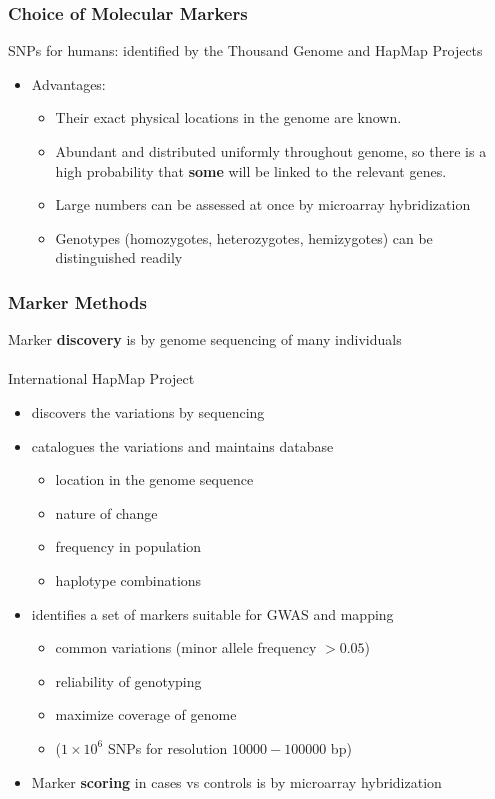 \documentclass[10pt]{article}
\begin{document}
\subsubsection*{Choice of Molecular Markers}
SNPs for humans: identified by the Thousand Genome and HapMap Projects
\begin{itemize}
	\item Advantages:
	\begin{itemize}
	    \item Their exact physical locations in the genome are known.
	    \item Abundant and distributed uniformly throughout genome, so there is a high probability that \textbf{some} will be linked to the relevant genes.
	    \item Large numbers can be assessed at once by microarray hybridization
	    \item Genotypes (homozygotes, heterozygotes, hemizygotes) can be distinguished readily
    \end{itemize}
\end{itemize}

\subsubsection*{Marker Methods}
Marker \textbf{discovery} is by genome sequencing of many individuals\\\\
International HapMap Project
\begin{itemize}
	\item discovers the variations by sequencing
	\item catalogues the variations and maintains database
	\begin{itemize}
	    \item location in the genome sequence
	    \item nature of change
	    \item frequency in population
	    \item haplotype combinations
    \end{itemize}
	\item identifies a set of markers suitable for GWAS and mapping
	\begin{itemize}
	    \item common variations (minor allele frequency $>0.05$)
	    \item reliability of genotyping
	    \item maximize coverage of genome
	    \item ($1 \times 10^6$ SNPs for resolution $10000-100000$ bp)
    \end{itemize}
    \item Marker \textbf{scoring} in cases vs controls is by microarray hybridization
\end{itemize}
\end{document}
